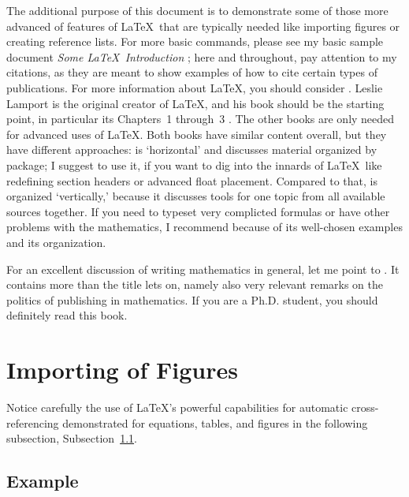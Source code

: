 \documentclass[12pt]{article}
\numberwithin{equation}{section}
\numberwithin{table}{section}
\numberwithin{figure}{section}
\begin{document}
The additional purpose of this document is to demonstrate some of
those more advanced of features of \LaTeX\ that are typically needed
like importing figures or creating reference lists. For more basic
commands, please see my basic sample document \emph{Some \LaTeX\ Introduction}
\cite{homepage}; here and throughout, pay attention to my citations,
as they are meant to show examples of how to cite certain types of
publications. For more information about \LaTeX, you should consider
\cite{Goossens94,Graetzer1996,Lamport94}.
Leslie Lamport is the original creator of \LaTeX,
and his book \cite{Lamport94}
should be the starting point, in particular its Chapters~1 through~3
\cite[Chapters~1--3]{Lamport94}.
The other books \cite{Goossens94,Graetzer1996}
are only needed for advanced uses of \LaTeX.
Both books have similar content overall,
but they have different approaches: \cite{Goossens94} is `horizontal'
and discusses material organized by package; I suggest to use it,
if you want to dig into the innards
of \LaTeX\ like redefining section headers or advanced float placement.
Compared to that, \cite{Graetzer1996} is organized `vertically,'
because it discusses tools for one topic from all available sources together.
If you need to typeset very complicted formulas or have other problems
with the mathematics, I recommend \cite{Graetzer1996} because of its
well-chosen examples and its organization.

For an excellent discussion of writing mathematics in general, let me point
to \cite{Higham98}. It contains more than the title lets on, namely
also very relevant remarks on the politics of publishing in
mathematics. If you are a Ph.D. student, you should definitely
read this book.

\section{Importing of Figures} \label{secimport}

Notice carefully the use of \LaTeX's powerful capabilities for automatic
cross-referencing demonstrated
for equations, tables, and figures
in the following subsection,
Subsection~\ref{subsecexample}.

\subsection{Example} \label{subsecexample}
\end{document}
